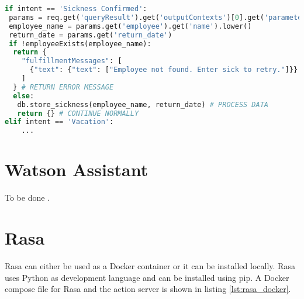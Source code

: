 \begin{lstlisting}[caption={Dialogflow Intent Handling}, label={lst:dialogflow_intent_handling},captionpos=b,frame=single,language={Python},commentstyle=\color{mygreen},keywordstyle=\color{blue},
    morekeywords={}]                
if intent == 'Sickness Confirmed':
 params = req.get('queryResult').get('outputContexts')[0].get('parameters')
 employee_name = params.get('employee').get('name').lower()
 return_date = params.get('return_date')
 if !employeeExists(employee_name):
  return {
    "fulfillmentMessages": [
      {"text": {"text": ["Employee not found. Enter sick to retry."]}}
    ]
  } # RETURN ERROR MESSAGE
  else:
   db.store_sickness(employee_name, return_date) # PROCESS DATA
   return {} # CONTINUE NORMALLY
elif intent == 'Vacation':
    ...
\end{lstlisting}  

\section{Watson Assistant}
To be done \cite{watsonassistant}.
 
\section{Rasa}
Rasa\cite{rasa} can either be used as a Docker container or 
it can be installed locally.
Rasa uses Python as development language and can be installed using pip.
A Docker compose file for Rasa and the action server is shown in listing 
\ref{lst:rasa_docker}.

